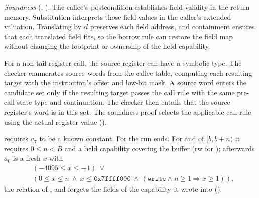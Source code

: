\emph{Soundness} (, ). The callee's postcondition establishes field validity in the return memory. Substitution interprets those field values in the caller's extended valuation. Translating by $d$ preserves each field address, and containment ensures that each translated field fits, so the borrow rule can restore the field map without changing the footprint or ownership of the held capability.

For a non-tail register call, the source register can have a symbolic type. The checker enumerates source words from the callee table, computing each resulting target with the instruction's offset and low-bit mask. A source word enters the candidate set only if the resulting target passes the call rule with the same pre-call state type and continuation. The checker then entails that the source register's word is in this set. The soundness proof selects the applicable call rule using the actual register value ().

 requires $a_7$ to be a known constant. For  the run ends. For  and  of $[b,b+n)$ it requires $0\le n<B$ and a held capability covering the buffer (\textsf{rw} for ); afterwards $a_0$ is a fresh $x$ with
\[
\begin{aligned}&(-4095\le x\le-1)\ \lor{}\\ &(0\le x\le n\ \land\ x\le\mathtt{0x7ffff000}\ \land\ (\mathtt{write}\land n\ge1\Rightarrow x\ge1)),\end{aligned}
\]
the relation of , and  forgets the fields of the capability it wrote into ().

